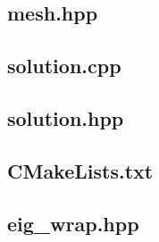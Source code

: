 \documentclass[a4paper, 12pt]{article}
\begin{document}
\subsection{mesh.hpp} \label{subsec:mesh.hpp}


\subsection{solution.cpp} \label{subsec:solution.cpp}

\subsection{solution.hpp} \label{subsec:solution.hpp}


\subsection{CMakeLists.txt} \label{subsec:CMakeLists.txt}


\subsection{eig\_wrap.hpp} \label{subsec:eig_wrap.hpp}

\end{document}
